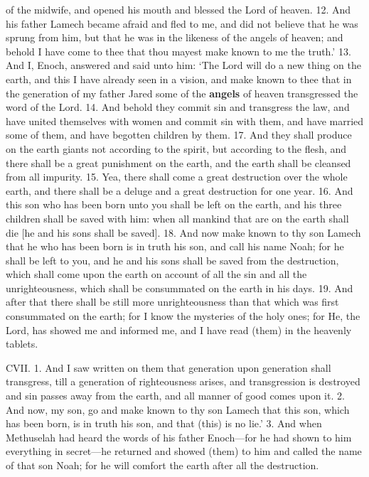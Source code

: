 of the midwife, and opened his mouth and blessed
the Lord of heaven. 12. And his father Lamech
became afraid and fled to me, and did not believe
that he was sprung from him, but that he was in
the likeness of the angels of heaven; and behold I
have come to thee that thou mayest make known to
me the truth.’ 13. And I, Enoch, answered and
said unto him: ‘The Lord will do a new thing on
the earth, and this I have already seen in a vision,
and make known to thee that in the generation of
my father Jared some of the \textbf{angels} of heaven transgressed
the word of the Lord. 14. And behold they
commit sin and transgress the law, and have united
themselves with women and commit sin with them,
and have married some of them, and have begotten
children by them. 17. And they shall produce on
the earth giants not according to the spirit, but
according to the flesh, and there shall be a great
punishment on the earth, and the earth shall be
cleansed from all impurity. 15. Yea, there shall
come a great destruction over the whole earth, and
there shall be a deluge and a great destruction for
one year. 16. And this son who has been born unto
you shall be left on the earth, and his three children
shall be saved with him: when all mankind that are
on the earth shall die [he and his sons shall be saved].
18. And now make known to thy son Lamech that he
who has been born is in truth his son, and call his
name Noah; for he shall be left to you, and he and
his sons shall be saved from the destruction, which
shall come upon the earth on account of all the sin
and all the unrighteousness, which shall be consummated
on the earth in his days. 19. And after that
there shall be still more unrighteousness than that
which was first consummated on the earth; for I
know the mysteries of the holy ones; for He, the
Lord, has showed me and informed me, and I have
read (them) in the heavenly tablets.

CVII. 1. And I saw written on them that generation
upon generation shall transgress, till a generation
of righteousness arises, and transgression is destroyed
and sin passes away from the earth, and all manner
of good comes upon it. 2. And now, my son, go
and make known to thy son Lamech that this son,
which has been born, is in truth his son, and that (this)
is no lie.’ 3. And when Methuselah had heard the
words of his father Enoch—for he had shown to him
everything in secret—he returned and showed (them)
to him and called the name of that son Noah; for
he will comfort the earth after all the destruction.


